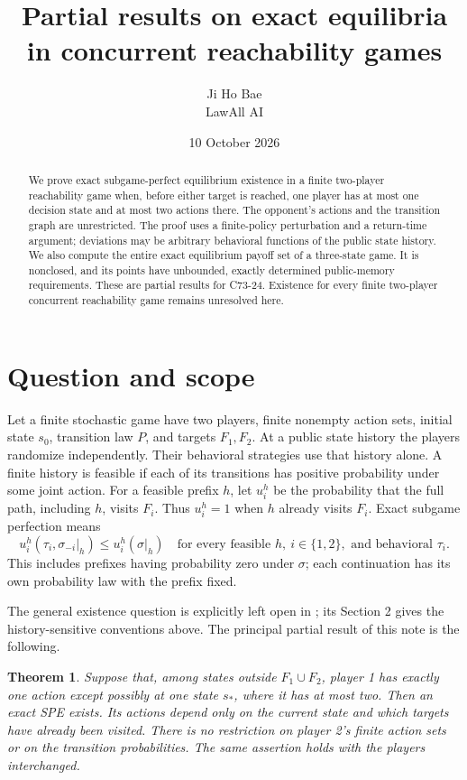 \documentclass[11pt]{article}
\title{Partial results on exact equilibria\\in concurrent reachability games}
\author{Ji Ho Bae\\\small LawAll AI}
\date{10 October 2026}
\newtheorem{theorem}{Theorem}
\begin{document}
\maketitle
\begin{abstract}
We prove exact subgame-perfect equilibrium existence in a finite two-player
reachability game when, before either target is reached, one player has
at most one decision state and at most two actions there. The opponent's
actions and the transition graph are unrestricted. The proof uses a
finite-policy perturbation and a return-time argument; deviations may be
arbitrary behavioral functions of the public state history. We also compute
the entire exact equilibrium payoff set of a three-state game. It is
nonclosed, and its points have unbounded, exactly determined public-memory
requirements. These are partial results for C73-24. Existence for every
finite two-player concurrent reachability game remains unresolved here.
\end{abstract}

\section{Question and scope}
Let a finite stochastic game have two players, finite nonempty action sets,
initial state $s_0$, transition law $P$, and targets $F_1,F_2$.
At a public state history the players randomize independently. Their
behavioral strategies use that history alone. A finite history is feasible
if each of its transitions has positive probability under some joint action.
For a feasible prefix $h$, let $u_i^h$ be the probability that the full
path, including $h$, visits $F_i$. Thus $u_i^h=1$ when $h$ already visits
$F_i$. Exact subgame perfection means
\begin{equation}\label{eq:spe}
 u_i^h(\tau_i,\sigma_{-i}|_h)\leq u_i^h(\sigma|_h)
 \quad\text{for every feasible }h,\ i\in\{1,2\},\text{ and behavioral }\tau_i.
\end{equation}
This includes prefixes having probability zero under $\sigma$; each
continuation has its own probability law with the prefix fixed.

The general existence question is explicitly left open in
\cite[Section 1]{RV}; its Section 2 gives the history-sensitive conventions
above. The principal partial result of this note is the following.

\begin{theorem}\label{thm:reach}
Suppose that, among states outside $F_1\cup F_2$, player 1 has exactly one
action except possibly at one state $s_*$, where it has at most two.
Then an exact SPE exists. Its actions depend only on the current state
and which targets have already been visited. There is no restriction on
player 2's finite action sets or on the transition probabilities.
The same assertion holds with the players interchanged.
\end{theorem}
\end{document}
